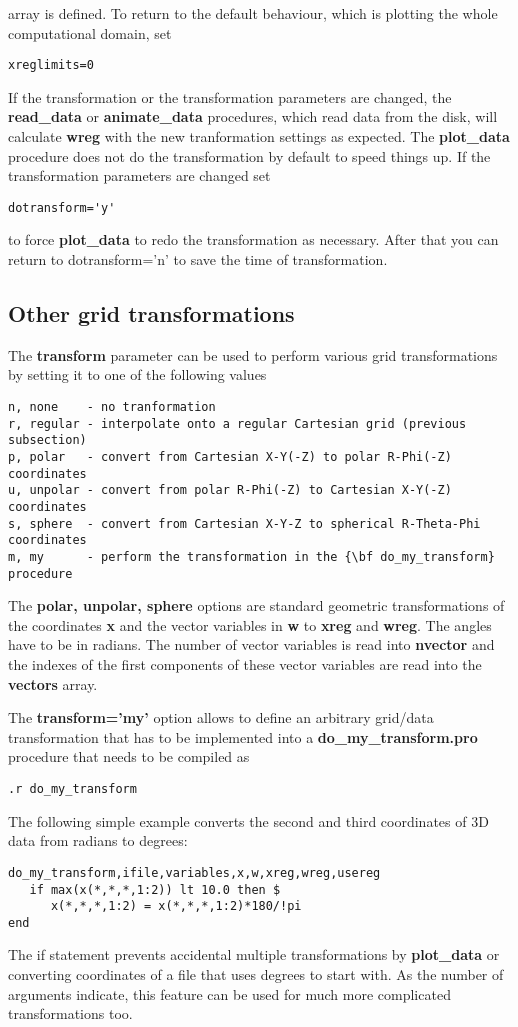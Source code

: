 \documentclass{article}
\begin{document}
   array is defined. 
   To return to the default behaviour, which is plotting the whole 
   computational domain, set
\begin{verbatim}
xreglimits=0
\end{verbatim}
   If the transformation or the transformation parameters are changed,
   the {\bf read\_data} or {\bf animate\_data} procedures, which read data from
   the disk, will calculate {\bf wreg} with the new tranformation settings
   as expected. The {\bf plot\_data} procedure does not do the transformation
   by default to speed things up. If the transformation parameters are changed set
\begin{verbatim}
dotransform='y'
\end{verbatim}
   to force {\bf plot\_data} to redo the transformation as necessary.
   After that you can return to dotransform='n' to save the time of
   transformation.

\subsection{Other grid transformations \label{s-gridtransform}}

   The {\bf transform} parameter can be used to perform various
   grid transformations by setting it to one of the following values
\begin{verbatim}
n, none    - no tranformation
r, regular - interpolate onto a regular Cartesian grid (previous subsection)
p, polar   - convert from Cartesian X-Y(-Z) to polar R-Phi(-Z) coordinates
u, unpolar - convert from polar R-Phi(-Z) to Cartesian X-Y(-Z) coordinates
s, sphere  - convert from Cartesian X-Y-Z to spherical R-Theta-Phi coordinates
m, my      - perform the transformation in the {\bf do_my_transform} procedure
\end{verbatim}
The {\bf polar, unpolar, sphere} options are standard geometric
transformations of the coordinates {\bf x} and the vector variables in
{\bf w} to {\bf xreg} and {\bf wreg}. The angles have to be in
radians.  The number of vector variables is read into {\bf nvector}
and the indexes of the first components of these vector variables are
read into the {\bf vectors} array.

The {\bf transform='my'} 
option allows to define an arbitrary grid/data transformation
that has to be implemented into a {\bf do\_my\_transform.pro}
procedure that needs to be compiled as
\begin{verbatim}
.r do_my_transform
\end{verbatim}
The following simple example converts the second and third coordinates 
of 3D data from radians to degrees:
\begin{verbatim}
do_my_transform,ifile,variables,x,w,xreg,wreg,usereg
   if max(x(*,*,*,1:2)) lt 10.0 then $
      x(*,*,*,1:2) = x(*,*,*,1:2)*180/!pi
end
\end{verbatim}
The if statement prevents accidental multiple transformations 
by {\bf plot\_data} or converting coordinates of a file that uses 
degrees to start with.
As the number of arguments indicate, this feature can be used for much more 
complicated transformations too.
\end{document}
